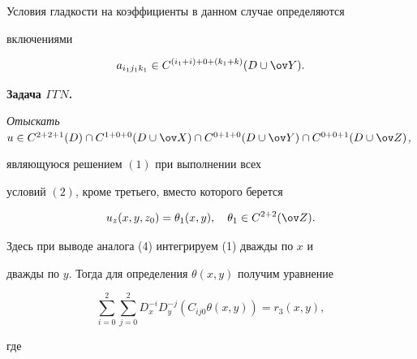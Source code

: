  


Условия гладкости на коэффициенты в данном случае определяются 


включениями


$$


a_{i_1j_1k_1}\in C^{(i_1+i)+0+(k_1+k)}(D\cup\ov Y). 


$$


 


{\bf Задача $\varGamma\varGamma N$.} {\it Отыскать $u\in C^{2+2+1}(D) \cap 


C^{1+0+0}(D\cup\ov X)\cap C^{0+1+0}(D\cup\ov Y)\cap C^{0+0+1}(D\cup\ov 


Z)$, 


являющуюся решением $(1)$ при выполнении всех 


условий $(2)$, кроме третьего, вместо которого берется} 


$$ 


u_z(x,y,z_0)=\theta_1(x,y),\quad \theta_1\in C^{2+2}(\ov Z). 


$$ 


 


 


Здесь при выводе аналога (4) интегрируем (1) дважды по $x$ и 


дважды по $y$. Тогда для определения $\theta(x,y)$ получим уравнение 


\begin{equation} 


\sum^2_{i=0}\sum^2_{j=0}D^{-i}_x D^{-j}_y 


(C_{ij0}\theta(x,y))=r_3(x,y), 


\end{equation} 


где 


